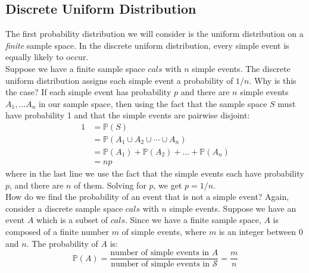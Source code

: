 \documentclass[12pt]{article}
\theoremstyle{definition}
\theoremstyle{remark}
\def\P{{\mathbb P}}
\def\cals{{\mathcal S}}
\begin{document}

\subsection{Discrete Uniform Distribution}
The first probability distribution we will consider is the uniform distribution on a \emph{finite} sample space. In the discrete uniform distribution, every simple event is equally likely to occur. \\

Suppose we have a finite sample space $cals$ with $n$ simple events. The discrete uniform distribution assigns each simple event a probability of $1/n$. Why is this the case? If each simple event has probability $p$ and there are $n$ simple events $A_1, \dots A_n$ in our sample space, then using the fact that the sample space $S$ must have probability 1 and that the simple events are pairwise disjoint:
\begin{align*}
1 &= \P(S) \\
&= \P(A_1 \cup A_2 \cup \cdots \cup A_n) \\
&= \P(A_1) + \P(A_2) + \dots + \P(A_n) \\
&= np
\end{align*}
where in the last line we use the fact that the simple events each have probability $p$, and there are $n$ of them. Solving for $p$, we get $p = 1/n$.\\

How do we find the probability of an event that is not a simple event? Again, consider a discrete sample space $cals$ with $n$ simple events. Suppose we have an event $A$ which is a subset of $cals$. Since we have a finite sample space, $A$ is composed of a finite number $m$ of simple events, where $m$ is an integer between 0 and $n$. The probability of $A$ is:
\[
\P(A) = \frac{ \text{number of simple events in $A$}}{\text{number of simple events in $\cals$}} = \frac{m}{n}
\]
\end{document}
